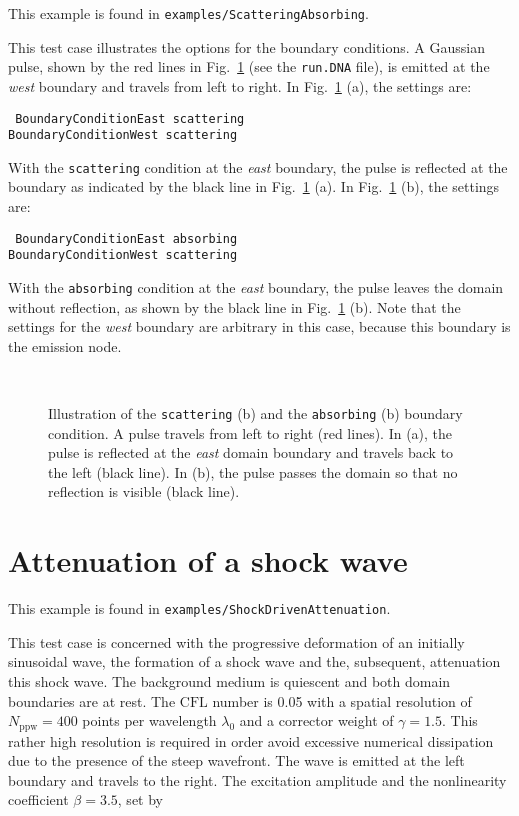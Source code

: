 This example is found in {\tt examples/ScatteringAbsorbing}.

This test case illustrates the options for the boundary conditions. A Gaussian pulse, shown by the red lines in Fig.~\ref{fig:BC} (see the {\tt run.DNA} file), is emitted at the \textit{west} boundary and travels from left to right. In Fig.~\ref{fig:BC} (a), the settings are:

{\tt
BoundaryConditionEast scattering\\
BoundaryConditionWest scattering
}

With the {\tt scattering} condition at the \textit{east} boundary, the pulse is reflected at the boundary as indicated by the black line in Fig.~\ref{fig:BC} (a). In Fig.~\ref{fig:BC} (b), the settings are:

{\tt
BoundaryConditionEast absorbing\\
BoundaryConditionWest scattering
}

With the {\tt absorbing} condition at the \textit{east} boundary, the pulse leaves the domain without reflection, as shown by the black line in Fig.~\ref{fig:BC} (b). Note that the settings for the \textit{west} boundary are arbitrary in this case, because this boundary is the emission node.

\begin{figure}[t]
    \centering
     \
    \caption{Illustration of the {\tt scattering} (b) and the {\tt absorbing} (b) boundary condition. A pulse travels from left to right (red lines). In (a), the pulse is reflected at the  \textit{east}  domain boundary and travels back to the left (black line). In (b), the pulse passes the domain so that no reflection is visible (black line).}
    \label{fig:BC}
\end{figure}


\section{Attenuation of a shock wave}

This example is found in {\tt examples/ShockDrivenAttenuation}.

This test case is concerned with the progressive deformation of an initially sinusoidal wave, the formation of a shock wave and the, subsequent, attenuation this shock wave. The background medium is quiescent and both domain boundaries are at rest. The $\mathrm{CFL}$ number is 0.05 with a spatial resolution of $N_{\mathrm{ppw}}=400$ points per wavelength $\lambda_0$ and a corrector weight of $\gamma=1.5$. This rather high resolution is required in order avoid excessive numerical dissipation due to the presence of the steep wavefront. The wave is emitted at the left boundary and travels to the right. The excitation amplitude and the nonlinearity coefficient $\beta=3.5$, set by


